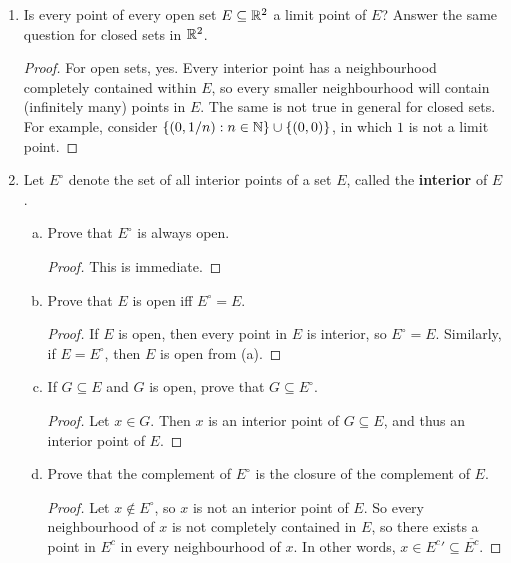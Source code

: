 \begin{enumerate}
\begin{enumerate}[(a)]
\begin{proof}
The inclusion can be proper: let $A_n$ be the set of rationals such that $q = m/n$ in lowest form. Then, $B = \Q$, whose closure is $\R$, whereas the right side is still $\Q$, as $\overline{A_i} = A_i$ for all $i$.
\end{proof}
\end{enumerate}

\item %
Is every point of every open set $E \subseteq \mathbb{R}^2$ a limit point of $E$? Answer the same question for closed sets in $\mathbb{R}^2$.

\begin{proof}
For open sets, yes. Every interior point has a neighbourhood completely contained within $E$, so every smaller neighbourhood will contain (infinitely many) points in $E$. The same is not true in general for closed sets. For example, consider $\{(0, 1/n): n \in \mathbb{N}\} \cup \{(0, 0)\}$, in which $1$ is not a limit point. 
\end{proof}

\item %
Let $E^\circ$ denote the set of all interior points of a set $E$, called the \textbf{interior} of $E$.
\begin{enumerate}[(a)]
\item Prove that $E^\circ$ is always open.
\begin{proof}
This is immediate.
\end{proof}

\item Prove that $E$ is open iff $E^\circ = E$.
\begin{proof}
If $E$ is open, then every point in $E$ is interior, so $E^\circ = E$. Similarly, if $E = E^\circ$, then $E$ is open from (a).
\end{proof}

\item If $G \subseteq E$ and $G$ is open, prove that $G \subseteq E^\circ$. 
\begin{proof}
Let $x \in G$. Then $x$ is an interior point of $G \subseteq E$, and thus an interior point of $E$.
\end{proof}

\item Prove that the complement of $E^\circ$ is the closure of the complement of $E$.
\begin{proof}
Let $x \not\in E^\circ$, so $x$ is not an interior point of $E$. So every neighbourhood of $x$ is not completely contained in $E$, so there exists a point in $E^c$ in every neighbourhood of $x$. In other words, $x \in {E^c}' \subseteq \overline{E^c}$. 


\end{proof}
\end{enumerate}
\end{enumerate}
